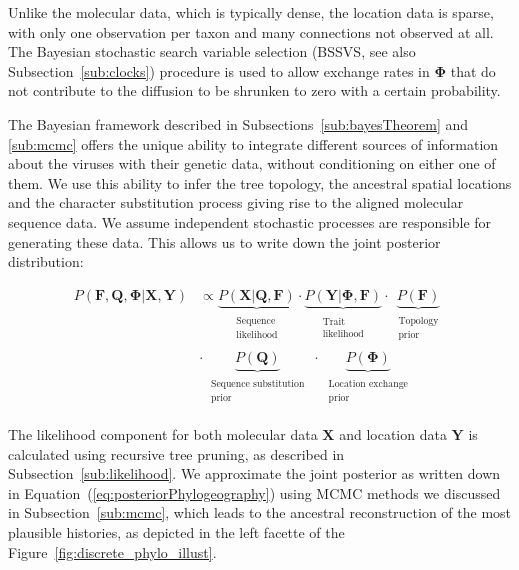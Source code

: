 Unlike the molecular data, which is typically dense, the location data is sparse, with only one observation per taxon and many connections not observed at all.
The Bayesian stochastic search variable selection (BSSVS, see also Subsection~\ref{sub:clocks}) procedure is used to allow exchange rates in $\mathbf{\Phi}$ that do not contribute to the diffusion to be shrunken to zero with a certain probability.

The Bayesian framework described in Subsections~\ref{sub:bayesTheorem} and \ref{sub:mcmc} offers the unique ability to integrate different sources of information about the viruses with their genetic data, without conditioning on either one of them.
We use this ability to infer the tree topology, the ancestral spatial locations and the character substitution process giving rise to the aligned molecular sequence data. 
We assume independent stochastic processes are responsible for generating these data.
This allows us to write down the joint posterior distribution: 

\begin{align}
P\left(\mathbf{F}, \mathbf{Q}, \mathbf{\Phi}|\mathbf{X},\mathbf{Y}\right) &\propto 
\underbrace{P(\mathbf{X}|\mathbf{Q}, \mathbf{F})}_{\begin{array}{c}
\substack{\text{Sequence} \\ \text{likelihood}}
\end{array}}\cdot\underbrace{P(\mathbf{Y}|\mathbf{\Phi}, \mathbf{F})}_{\begin{array}{c}
\substack{\text{Trait} \\ \text{likelihood}}
\end{array}}\cdot
\underbrace{P(\mathbf{F})}_{\begin{array}{c}
\substack{\text{Topology} \\ \text{prior}}
\end{array}} \nonumber \\
& \cdot \underbrace{P(\mathbf{Q})}_{\begin{array}{c}
\substack{\text{Sequence substitution} \\ \text{prior}}
\end{array}}\cdot\underbrace{P(\mathbf{\Phi})}_{\begin{array}{c}
\substack{\text{Location exchange} \\ \text{prior}}
\end{array}}
\label{eq:posteriorPhylogeography}
\end{align}

The likelihood component for both molecular data $\mathbf{X}$ and location data $\mathbf{Y}$ is calculated using recursive tree pruning, as described in Subsection~\ref{sub:likelihood}.
We approximate the joint posterior as written down in Equation~(\ref{eq:posteriorPhylogeography}) using MCMC methods we discussed in Subsection~\ref{sub:mcmc}, which leads to the ancestral reconstruction of the most plausible histories, as depicted in the left facette of the Figure~\ref{fig:discrete_phylo_illust}.

